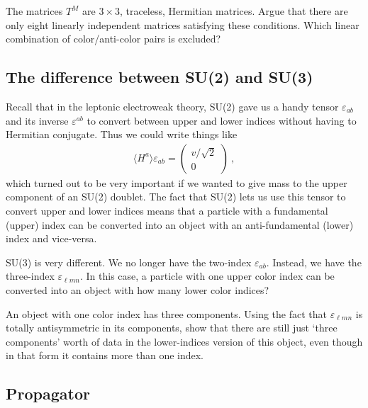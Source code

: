 \documentclass[12pt]{article}
\begin{document}
The matrices $T^M$ are $3\times 3$, traceless, Hermitian matrices. Argue that there are only eight linearly independent matrices satisfying these conditions. Which linear combination of color/anti-color pairs is excluded?



\subsection{The difference between SU(2) and SU(3)}

Recall that in the leptonic electroweak theory, SU(2) gave us a handy tensor $\varepsilon_{a b}$ and its inverse $\varepsilon^{ab}$ to convert between upper and lower indices without having to Hermitian conjugate. Thus we could write things like 
\begin{align}
	\langle H^a \rangle \varepsilon_{ab} = 
	\begin{pmatrix}
		v/\sqrt{2}
		\\
		0
	\end{pmatrix} \ ,
\end{align}
which turned out to be very important if we wanted to give mass to the upper component of an SU(2) doublet. The fact that SU(2) lets us use this tensor to convert upper and lower indices means that a particle with a fundamental (upper) index can be converted into an object with an anti-fundamental (lower) index and vice-versa. 

SU(3) is very different. We no longer have the two-index $\varepsilon_{ab}$. Instead, we have the three-index $\varepsilon_{\ell m n}$. In this case, a particle with one upper color index can be converted into an object with how many lower color indices?

An object with one color index has three components. Using the fact that $\varepsilon_{\ell m n}$ is totally antisymmetric in its components, show that there are still just `three components' worth of data in the lower-indices version of this object, even though in that form it contains more than one index.




\subsection{Propagator}
\end{document}
